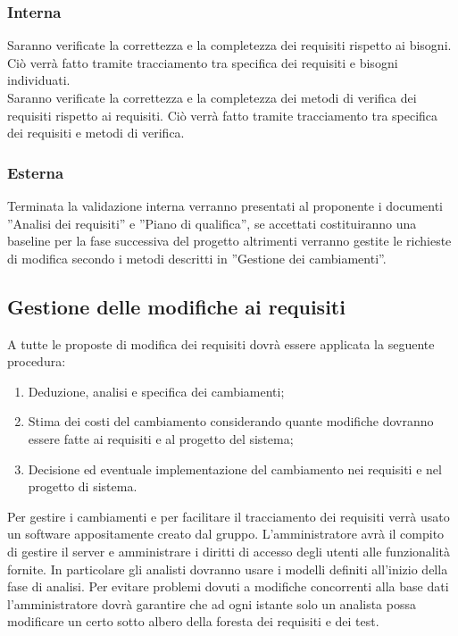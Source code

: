 {{			\subsubsection{Interna}{
				Saranno verificate la correttezza e la completezza dei requisiti rispetto ai bisogni. Ciò verrà fatto tramite tracciamento tra specifica dei requisiti e bisogni individuati.\\Saranno verificate la correttezza e la completezza dei metodi di verifica dei requisiti
				rispetto ai requisiti. Ciò verrà fatto tramite tracciamento tra specifica dei requisiti e metodi di verifica.
			}
				\subsubsection{Esterna}{
					Terminata la validazione interna verranno presentati al proponente i documenti ”Analisi dei requisiti” e ”Piano di qualifica”, se accettati costituiranno una baseline per la fase successiva del progetto altrimenti verranno gestite le richieste di modifica secondo i metodi descritti in ”Gestione dei cambiamenti”.
				}
		}
		\subsection{Gestione delle modifiche ai requisiti}{
			A tutte le proposte di modifica dei requisiti dovrà essere applicata la seguente procedura:
			\begin{enumerate}
				\item Deduzione, analisi e specifica dei cambiamenti;
				\item Stima dei costi del cambiamento considerando quante modifiche dovranno essere fatte ai requisiti\ped{g} e al progetto del sistema;
				\item Decisione ed eventuale implementazione del cambiamento nei requisiti\ped{g} e nel progetto di sistema.
			\end{enumerate}
			Per gestire i cambiamenti e per facilitare il tracciamento dei requisiti verrà usato un software appositamente creato dal gruppo. L’amministratore avrà il compito di gestire il server e amministrare i diritti di accesso degli utenti alle funzionalità fornite. In particolare gli analisti dovranno usare i modelli definiti all’inizio della fase di analisi. Per evitare problemi dovuti a modifiche concorrenti alla base dati l’amministratore dovrà garantire che ad ogni istante solo un analista possa modificare un certo sotto albero della foresta dei requisiti e dei test.
			}
			
}
